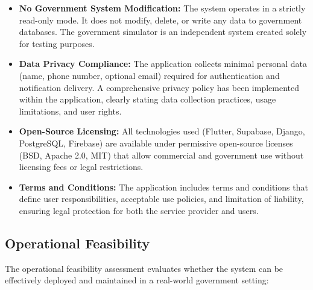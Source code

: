 \begin{itemize}
    \item \textbf{No Government System Modification:} The system operates in a strictly read-only mode. It does not modify, delete, or write any data to government databases. The government simulator is an independent system created solely for testing purposes.

    \item \textbf{Data Privacy Compliance:} The application collects minimal personal data (name, phone number, optional email) required for authentication and notification delivery. A comprehensive privacy policy has been implemented within the application, clearly stating data collection practices, usage limitations, and user rights.

    \item \textbf{Open-Source Licensing:} All technologies used (Flutter, Supabase, Django, PostgreSQL, Firebase) are available under permissive open-source licenses (BSD, Apache 2.0, MIT) that allow commercial and government use without licensing fees or legal restrictions.

    \item \textbf{Terms and Conditions:} The application includes terms and conditions that define user responsibilities, acceptable use policies, and limitation of liability, ensuring legal protection for both the service provider and users.
\end{itemize}

\subsection{Operational Feasibility}

The operational feasibility assessment evaluates whether the system can be effectively deployed and maintained in a real-world government setting:

